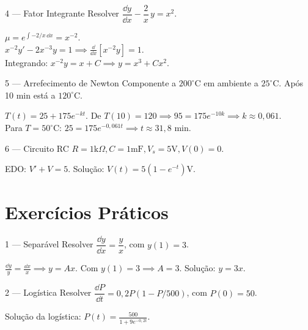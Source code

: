 \begin{exbox}{4 --- Fator Integrante}
  Resolver $\dfrac{\dd y}{\dd x} - \dfrac{2}{x}\,y = x^2$.
\end{exbox}
\begin{solbox}
  $\mu = e^{\int -2/x\,\dd x} = x^{-2}$. \\
  $x^{-2}y' - 2x^{-3}y = 1 \implies \frac{\dd}{\dd x}[x^{-2}y] = 1$. \\
  Integrando: $x^{-2}y = x + C \implies \boxed{y = x^3 + Cx^2.}$
\end{solbox}

\begin{exbox}{5 --- Arrefecimento de Newton}
  Componente a $200^\circ\text{C}$ em ambiente a $25^\circ\text{C}$. Após 10 min está a $120^\circ\text{C}$.
\end{exbox}
\begin{solbox}
  $T(t) = 25 + 175e^{-kt}$. De $T(10)=120 \implies 95 = 175e^{-10k} \implies k \approx 0,061$. \\
  Para $T=50^\circ\text{C}$: $25 = 175e^{-0,061t} \implies t \approx 31,8 \text{ min}$.
\end{solbox}

\begin{exbox}{6 --- Circuito RC}
  $R=1\text{k}\Omega, C=1\text{mF}, V_s=5\text{V}, V(0)=0$.
\end{exbox}
\begin{solbox}
  EDO: $V' + V = 5$. Solução: $V(t) = 5(1-e^{-t})\text{V}$.
\end{solbox}

\section{Exercícios Práticos}

\begin{exercisebox}{1 --- Separável}
  Resolver $\dfrac{\dd y}{\dd x} = \dfrac{y}{x}$, com $y(1)=3$.
\end{exercisebox}
\begin{solbox}
  $\frac{\dd y}{y} = \frac{\dd x}{x} \implies y = Ax$. Com $y(1)=3 \implies A=3$. Solução: $\boxed{y=3x.}$
\end{solbox}

\begin{exercisebox}{2 --- Logística}
  Resolver $\dfrac{\dd P}{\dd t} = 0,2P(1 - P/500)$, com $P(0) = 50$.
\end{exercisebox}
\begin{solbox}
  Solução da logística: $P(t) = \frac{500}{1+9e^{-0,2t}}$.
\end{solbox}

